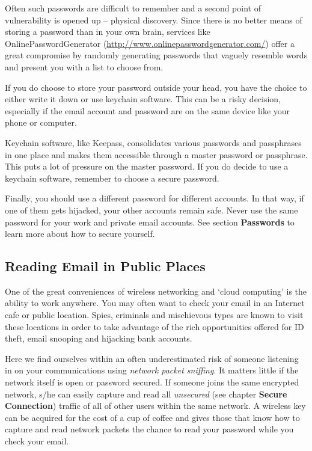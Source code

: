 Often such passwords are difficult to remember and a second point of
vulnerability is opened up -- physical discovery. Since there is no
better means of storing a password than in your own brain, services like
OnlinePasswordGenerator
(\href{http://www.onlinepasswordgenerator.com/}{http://www.onlinepasswordgenerator.com/})
offer a great compromise by randomly generating passwords that vaguely
resemble words and present you with a list to choose from.

If you do choose to store your password outside your head, you have the
choice to either write it down or use keychain software. This can be a
risky decision, especially if the email account and password are on the
same device like your phone or computer.

Keychain software, like Keepass, consolidates various passwords and
passphrases in one place and makes them accessible through a master
password or passphrase. This puts a lot of pressure on the master
password. If you do decide to use a keychain software, remember to
choose a secure password.

Finally, you should use a different password for different accounts. In
that way, if one of them gets hijacked, your other accounts remain safe.
Never use the same password for your work and private email accounts.
See section \textbf{Passwords} to learn more about how to secure
yourself.

\subsection{Reading Email in Public Places}

One of the great conveniences of wireless networking and `cloud
computing' is the ability to work anywhere. You may often want to check
your email in an Internet cafe or public location. Spies, criminals and
mischievous types are known to visit these locations in order to take
advantage of the rich opportunities offered for ID theft, email snooping
and hijacking bank accounts.

Here we find ourselves within an often underestimated risk of someone
listening in on your communications using \emph{network packet
sniffing}. It matters little if the network itself is open or password
secured. If someone joins the same encrypted network, s/he can easily
capture and read all \emph{unsecured} (see chapter \textbf{Secure
Connection}) traffic of all of other users within the same network. A
wireless key can be acquired for the cost of a cup of coffee and gives
those that know how to capture and read network packets the chance to
read your password while you check your email.

